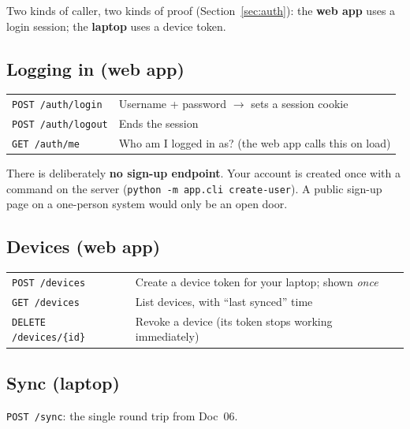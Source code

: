 \documentclass[11pt,a4paper]{article}
\begin{document}
Two kinds of caller, two kinds of proof (Section~\ref{sec:auth}): the \textbf{web app} uses a
login session; the \textbf{laptop} uses a device token.

\subsection{Logging in (web app)}
\begin{center}
\renewcommand{\arraystretch}{1.15}
\begin{tabularx}{\textwidth}{l X}
\toprule
\texttt{POST /auth/login}  & Username + password $\to$ sets a session cookie \\
\texttt{POST /auth/logout} & Ends the session \\
\texttt{GET  /auth/me}     & Who am I logged in as? (the web app calls this on load) \\
\bottomrule
\end{tabularx}
\end{center}
\noindent There is deliberately \textbf{no sign-up endpoint}. Your account is created once with a
command on the server (\texttt{python -m app.cli create-user}). A public sign-up page on a
one-person system would only be an open door.

\subsection{Devices (web app)}
\begin{center}
\renewcommand{\arraystretch}{1.15}
\begin{tabularx}{\textwidth}{l X}
\toprule
\texttt{POST /devices}          & Create a device token for your laptop; shown \emph{once} \\
\texttt{GET  /devices}          & List devices, with ``last synced'' time \\
\texttt{DELETE /devices/\{id\}} & Revoke a device (its token stops working immediately) \\
\bottomrule
\end{tabularx}
\end{center}

\subsection{Sync (laptop)}
\texttt{POST /sync}: the single round trip from Doc~06.
\end{document}
